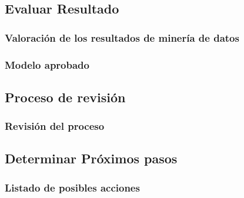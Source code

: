 \subsection{Evaluar Resultado}
    \subsubsection{Valoración de los resultados de minería de datos}
    \subsubsection{Modelo aprobado}
\subsection{Proceso de revisión}
    \subsubsection{Revisión del proceso}
\subsection{Determinar Próximos pasos}
    \subsubsection{Listado de posibles acciones}
